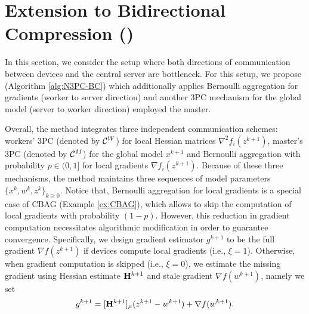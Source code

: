 \documentclass[11pt]{article}
\begin{document}
	\section{Extension to Bidirectional Compression ()}\label{sec:N3PC-BC}
	
	In this section, we consider the setup where both directions of communication between devices and the central server are bottleneck. For this setup, we propose  (Algorithm \ref{alg:N3PC-BC}) which additionally applies Bernoulli aggregation for gradients (worker to server direction) and another 3PC mechanism for the global model (server to worker direction) employed the master.
	
	Overall, the method integrates three independent communication schemes: workers' 3PC (denoted by ${\mathcal{C}}^W$) for local Hessian matrices $\nabla^2 f_i(z^{k+1})$, master's 3PC (denoted by ${\mathcal{C}}^M$) for the global model $x^{k+1}$ and Bernoulli aggregation with probability $p\in(0,1]$ for local gradients $\nabla f_i(z^{k+1})$. Because of these three mechanisms, the method maintains three sequences of model parameters $\{x^k,w^k,z^k\}_{k\ge0}$. Notice that, Bernoulli aggregation for local gradients is a special case of CBAG (Example \ref{ex:CBAG}), which allows to skip the computation of local gradients with probability $(1-p)$. However, this reduction in gradient computation necessitates algorithmic modification in order to guarantee convergence. Specifically, we design gradient estimator $g^{k+1}$ to be the full gradient $\nabla f(z^{k+1})$ if devices compute local gradients (i.e., $\xi=1$). Otherwise, when gradient computation is skipped (i.e., $\xi=0$), we estimate the missing gradient using Hessian estimate $\mathbf{H}^{k+1}$ and stale gradient $\nabla f(w^{k+1})$, namely we set $$g^{k+1} = [\mathbf{H}^{k+1}]_{\mu}(z^{k+1}-w^{k+1}) + \nabla f(w^{k+1}).$$
	
	
	
\end{document}
